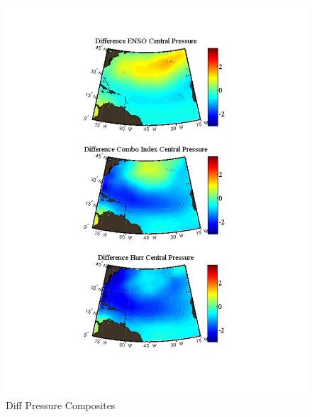 \documentclass[]{article}
\begin{document}
\begin{figure}[ht]
\begin{minipage}[b]{0.55\linewidth}
\includegraphics[width=\textwidth]{figures/comboIndex/composites/compareMDRCompositesCentralPressure.pdf}
\caption{Diff Pressure Composites}
\label{fig:figure21}
\end{minipage}
\hspace{0cm}
\begin{minipage}[b]{0.55\linewidth}

\end{minipage}
\end{figure}
\end{document}
